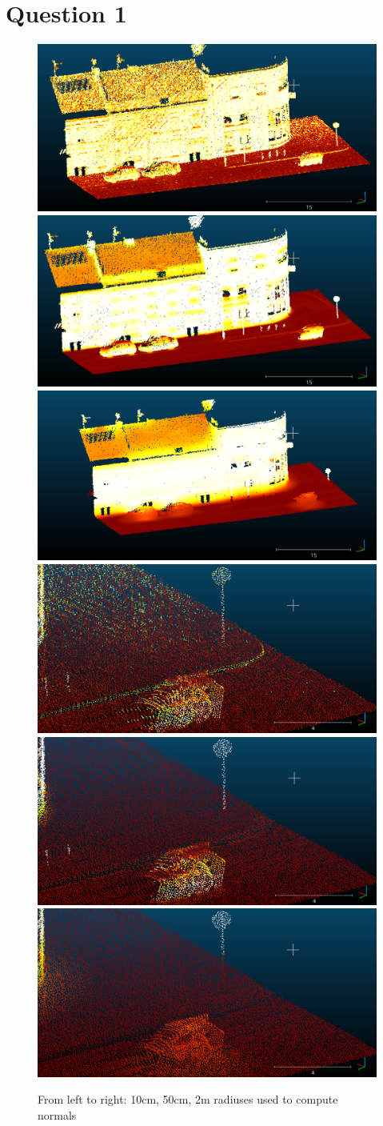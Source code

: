 \documentclass[a4paper]{article}
\begin{document}





\section*{Question 1}
\begin{figure}[ht]
  \centering
  \includegraphics[width=0.3\linewidth]{figures/cc_normals_10cm.png}
  \includegraphics[width=0.3\linewidth]{figures/cc_normals_50cm.png}
  \includegraphics[width=0.3\linewidth]{figures/cc_normals_2m.png}
  \includegraphics[width=0.3\linewidth]{figures/cc_normals_10cm_stopsign.png}
  \includegraphics[width=0.3\linewidth]{figures/cc_normals_50cm_stopsign.png}
  \includegraphics[width=0.3\linewidth]{figures/cc_normals_2m_stopsign.png}
  \caption{From left to right: 10cm, 50cm, 2m radiuses used to compute normals}
  \label{fig:cc_normals}
\end{figure}
\end{document}
